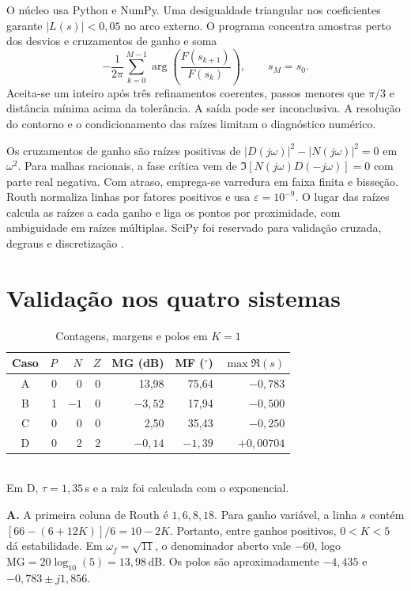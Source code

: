 \documentclass[conference]{IEEEtran}
\begin{document}
O núcleo usa Python e NumPy. Uma desigualdade triangular nos coeficientes garante $|L(s)|<0{,}05$ no arco externo. O programa concentra amostras perto dos desvios e cruzamentos de ganho e soma
\begin{equation}
 -\frac{1}{2\pi}\sum_{k=0}^{M-1}
 \arg\!\left(\frac{F(s_{k+1})}{F(s_k)}\right),\qquad s_M=s_0 .
\end{equation}
Aceita-se um inteiro após três refinamentos coerentes, passos menores que $\pi/3$ e distância mínima acima da tolerância. A saída pode ser inconclusiva. A resolução do contorno e o condicionamento das raízes limitam o diagnóstico numérico.

Os cruzamentos de ganho são raízes positivas de $|D(j\omega)|^2-|N(j\omega)|^2=0$ em $\omega^2$. Para malhas racionais, a fase crítica vem de $\Im[N(j\omega)D(-j\omega)]=0$ com parte real negativa. Com atraso, emprega-se varredura em faixa finita e bisseção. Routh normaliza linhas por fatores positivos e usa $\varepsilon=10^{-9}$. O lugar das raízes calcula as raízes a cada ganho e liga os pontos por proximidade, com ambiguidade em raízes múltiplas. SciPy foi reservado para validação cruzada, degraus e discretização \cite{scipy}.

\section{Validação nos quatro sistemas}
\begin{table}[htbp]
\caption{Contagens, margens e polos em $K=1$}
\label{tab:valid}
\centering\small
\begin{tabular}{@{}crrrrrr@{}}
\toprule
Caso & $P$ & $N$ & $Z$ & MG (dB) & MF ($^\circ$) & $\max\Re(s)$\\
\midrule
A &0&0&0&13,98&75,64&$-0{,}783$\\
B &1&$-1$&0&$-3{,}52$&17,94&$-0{,}500$\\
C &0&0&0&2,50&35,43&$-0{,}250$\\
D &0&2&2&$-0{,}14$&$-1{,}39$&$+0{,}00704$\\
\bottomrule
\end{tabular}\\
\footnotesize Em D, $\tau=1{,}35$\,s e a raiz foi calculada com o exponencial.
\end{table}

\textbf{A.} A primeira coluna de Routh é $1,6,8,18$. Para ganho variável, a linha $s$ contém $[66-(6+12K)]/6=10-2K$. Portanto, entre ganhos positivos, $0<K<5$ dá estabilidade. Em $\omega_f=\sqrt{11}$, o denominador aberto vale $-60$, logo $\mathrm{MG}=20\log_{10}(5)=13{,}98$\,dB. Os polos são aproximadamente $-4{,}435$ e $-0{,}783\pm j1{,}856$.
\end{document}
